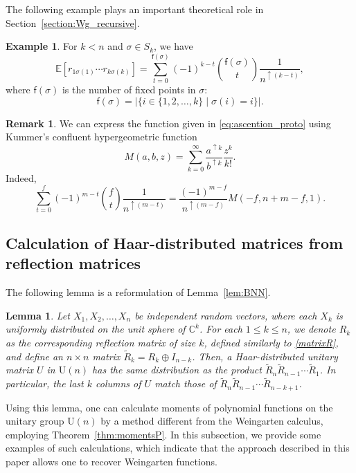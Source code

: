 \documentclass[pdftex]{sigma}
\numberwithin{equation}{section}
\newtheorem{Lemma}[Theorem]{Lemma}
\theoremstyle{definition}
\newtheorem{Example}[Theorem]{Example}
\newtheorem{Remark}[Theorem]{Remark}
\newcommand{\UU}{\mathrm{U}}
\newcommand{\fix}[1]{\mathsf{f}(#1)}
\begin{document}
The following example plays an important theoretical role in Section~\ref{section:Wg_recursive}.

\begin{Example} \label{ex:permutation_r}
For $k<n$ and $\sigma \in S_k$, we have
 \[
 \mathbb{E}[r_{1\sigma(1)} \cdots r_{k \sigma(k)}]= \sum_{t=0}^{\fix{\sigma}} (-1)^{k-t} \binom{\fix{\sigma}}{t} \frac{1}{n^{\uparrow (k-t)}},
 \]
 where $\fix{\sigma}$ is the number of fixed points in $\sigma$:
 \[
 \fix{\sigma} =|\{i \in \{1,2,\dots,k\} \mid \sigma(i)=i\}|.
 \]
\end{Example}

\begin{Remark}
We can express the function given in \eqref{eq:ascention_proto}
using Kummer's confluent hypergeometric function
\[
M(a,b,z)= \sum_{k=0}^\infty \frac{a^{\uparrow k}}{b^{\uparrow k}} \frac{z^k}{k!}.
\]
Indeed,
\[
\sum_{t=0}^f (-1)^{m-t} \binom{f}{t} \frac{1}{n^{\uparrow (m-t)}}
= \frac{(-1)^{m-f}}{n^{\uparrow (m-f)}} M(-f,n+m-f,1).
\]
\end{Remark}



\subsection{Calculation of Haar-distributed matrices from reflection matrices}\label{sec:compute-integral}


The following lemma is a reformulation of Lemma~\ref{lem:BNN}.

\begin{Lemma}
\label{lem:BNN_g}
Let $X_1,X_2, \dots, X_n$ be independent random vectors, where
each $X_k$ is uniformly distributed on the unit sphere of $\mathbb{C}^k$.
For each $1 \le k \le n$, we denote $R_k$ as the corresponding reflection matrix of size $k$, defined similarly to \eqref{matrixR},
and define an $n \times n$ matrix $\tilde{R}_k = R_k \oplus I_{n-k}$.
Then, a Haar-distributed unitary matrix $U$ in $\UU(n)$ has the same distribution as
the product $\tilde{R}_n \tilde{R}_{n-1} \cdots \tilde{R}_1$.
In particular, the last $k$ columns of $U$ match those of $\tilde{R}_n \tilde{R}_{n-1} \cdots \tilde{R}_{n-k+1}$.
\end{Lemma}

Using this lemma, one can calculate moments of polynomial functions on the unitary group $\UU(n)$ by a method different from the Weingarten calculus, employing Theorem~\ref{thm:momentsP}.
In this subsection, we provide some examples of such calculations, which indicate that the approach described in this paper allows one to recover Weingarten functions.
\end{document}
